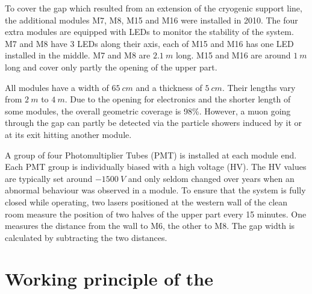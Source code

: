 To cover the gap which resulted from an extension of the cryogenic support line, the additional modules M7, M8, M15 and M16 were installed in 2010. The four extra modules are equipped with LEDs to monitor the stability of the system. M7 and M8 have 3 LEDs along their axis, each of M15 and M16 has one LED installed in the middle. M7 and M8 are $\SI{2.1}{m}$ long. M15 and M16 are around $\SI{1}{m}$ long and cover only partly the opening of the upper part.

All modules have a width of $\SI{65}{cm}$ and a thickness of $\SI{5}{cm}$. Their lengths vary from $\SI{2}{m}$ to $\SI{4}{m}$.
Due to the opening for electronics and the shorter length of some modules, the overall geometric coverage is 98\%. However, a muon going through the gap can partly be detected via the particle showers induced by it or at its exit hitting another module.

A group of four Photomultiplier Tubes (PMT) is installed at each module end. Each PMT group is individually biased with a high voltage (HV). The HV values are typically set around $\SI{-1500}{V}$ and only seldom changed over years when an abnormal behaviour was observed in a module. To ensure that the system is fully closed while operating, two lasers positioned at the western wall of the clean room measure the position of two halves of the upper part every 15 minutes. One measures the distance from the wall to M6, the other to M8. The gap width is calculated by subtracting the two distances.


\section{Working principle of the \mvs}
\label{sec:muon-working}


